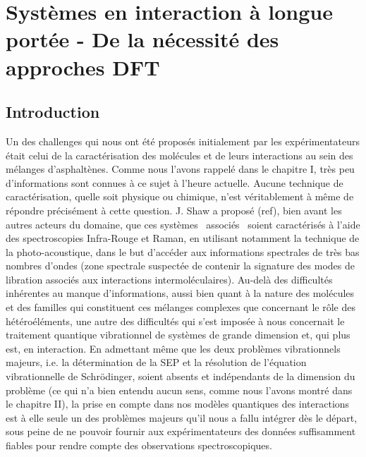 \documentclass[12pt,a4paper]{book}
\begin{document}
	

	\chapter[longue portee]{Systèmes en interaction à longue portée - De la nécessité des approches DFT}
	\minitoc
	\restoregeometry
	
	\newpage
	
	\section*{Introduction}
	
	Un des challenges qui nous ont été proposés initialement par les expérimentateurs était celui de la caractérisation des molécules et de leurs interactions au sein des mélanges d’asphaltènes. Comme nous l’avons rappelé dans le chapitre I, très peu d’informations sont connues à ce sujet à l’heure actuelle. Aucune technique de caractérisation, quelle soit physique ou chimique, n’est véritablement à même de répondre précisément à cette question. J. Shaw a proposé (ref), bien avant les autres acteurs du domaine, que ces systèmes \og associés \fg{} soient caractérisés à l’aide des spectroscopies Infra-Rouge et Raman, en utilisant notamment la technique de la photo-acoustique, dans le but d’accéder aux informations spectrales de très bas nombres d’ondes (zone spectrale suspectée de contenir la signature des modes de libration associés aux interactions intermoléculaires). Au-delà des difficultés inhérentes au manque d’informations, aussi bien quant à la nature des molécules et des familles qui constituent ces mélanges complexes que concernant le rôle des hétéroéléments, une autre des difficultés qui s’est imposée à nous concernait le traitement quantique vibrationnel de systèmes de grande dimension et, qui plus est, en interaction. En admettant même que les deux problèmes vibrationnels majeurs, i.e. la détermination de la SEP et la résolution de l’équation vibrationnelle de Schr\"{o}dinger, soient absents et indépendants de la dimension du problème (ce qui n’a bien entendu aucun sens, comme nous l’avons montré dans le chapitre II), la prise en compte dans nos modèles quantiques des interactions est à elle seule un des problèmes majeurs qu’il nous a fallu intégrer dès le départ, sous peine de ne pouvoir fournir aux expérimentateurs des données suffisamment fiables pour rendre compte des observations spectroscopiques. 
	
\end{document}
